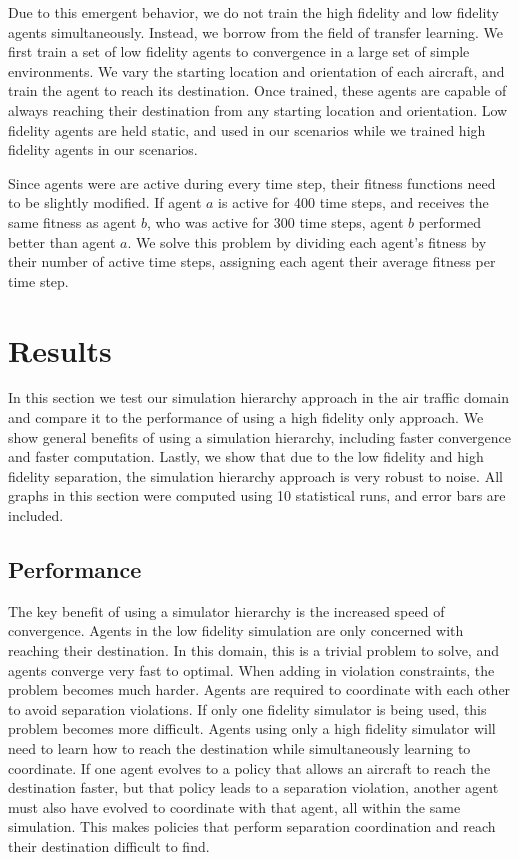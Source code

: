 \documentclass{aamas2014}
\begin{document}
Due to this emergent behavior, we do not train the high fidelity and low fidelity agents simultaneously. Instead, we borrow from the field of transfer learning. We first train a set of low fidelity agents to convergence in a large set of simple environments. We vary the starting location and orientation of each aircraft, and train the agent to reach its destination. Once trained, these agents are capable of always reaching their destination from any starting location and orientation. Low fidelity agents are held static, and used in our scenarios while we trained high fidelity agents in our scenarios.

Since agents were are active during every time step, their fitness functions need to be slightly modified. If agent $a$ is active for 400 time steps, and receives the same fitness as agent $b$, who was active for 300 time steps, agent $b$ performed better than agent $a$. We solve this problem by dividing each agent's fitness by their number of active time steps, assigning each agent their average fitness per time step. 

\section{Results}

In this section we test our simulation hierarchy approach in the air traffic domain and compare it to the performance of using a high fidelity only approach. We show general benefits of using a simulation hierarchy, including faster convergence and faster computation. Lastly, we show that due to the low fidelity and high fidelity separation, the simulation hierarchy approach is very robust to noise. All graphs in this section were computed using 10 statistical runs, and error bars are included.

\subsection{Performance}

The key benefit of using a simulator hierarchy is the increased speed of convergence. Agents in the low fidelity simulation are only concerned with reaching their destination. In this domain, this is a trivial problem to solve, and agents converge very fast to optimal. When adding in violation constraints, the problem becomes much harder. Agents are required to coordinate with each other to avoid separation violations. If only one fidelity simulator is being used, this problem becomes more difficult. Agents using only a high fidelity simulator will need to learn how to reach the destination while simultaneously learning to coordinate. If one agent evolves to a policy that allows an aircraft to reach the destination faster, but that policy leads to a separation violation, another agent must also have evolved to coordinate with that agent, all within the same simulation. This makes policies that perform separation coordination and reach their destination difficult to find. 
\end{document}

